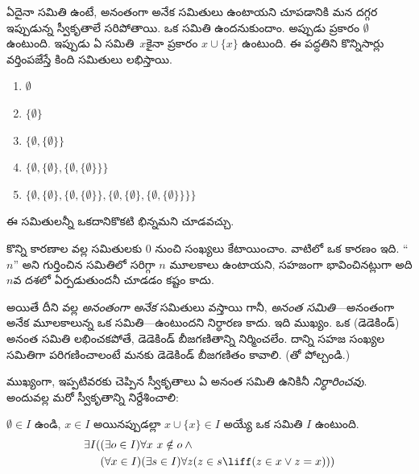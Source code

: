 \documentclass[../../../include/open-logic-section]{subfiles}
\begin{document}

ఏదైనా సమితి ఉంటే, అనంతంగా అనేక సమితులు ఉంటాయని చూపడానికి
మన దగ్గర ఇప్పుడున్న స్వీకృతాలే సరిపోతాయి.
ఒక సమితి
ఉందనుకుందాం. అప్పుడు
ప్రకారం $\emptyset$ ఉంటుంది.
ఇప్పుడు ఏ సమితి~$x$కైనా
ప్రకారం $x \cup \{x\}$ ఉంటుంది.
ఈ పద్ధతిని కొన్నిసార్లు వర్తింపజేస్తే కింది సమితులు లభిస్తాయి.
\begin{enumerate}
	\item[0.] $\emptyset$ %
	\item[1.] $ \{\emptyset\}$ %
	\item[2.] $\{\emptyset, \{\emptyset\}\}$ %
	\item[3.] $\{\emptyset, \{\emptyset\}, \{\emptyset, \{\emptyset\}\}\}$ %
	\item[4.] $\{\emptyset, \{\emptyset\}, \{\emptyset, \{\emptyset\}\}, \{\emptyset, \{\emptyset\}, \{\emptyset, \{\emptyset\}\}\}\}$%
\end{enumerate}
ఈ సమితులన్నీ ఒకదానికొకటి
భిన్నమని చూడవచ్చు.

కొన్ని కారణాల వల్ల సమితులకు $0$ నుంచి
సంఖ్యలు కేటాయించాం. వాటిలో ఒక కారణం ఇది.
``$n$'' అని గుర్తించిన
సమితిలో సరిగ్గా $n$
మూలకాలు ఉంటాయని,
సహజంగా భావించినట్లుగా అది
$n$వ దశలో ఏర్పడుతుందనీ
చూడడం కష్టం కాదు.

అయితే దీని వల్ల
\emph{అనంతంగా అనేక} సమితులు
వస్తాయి గానీ, \emph{అనంత
సమితి}---అనంతంగా అనేక
మూలకాలున్న ఒక సమితి---ఉంటుందని
నిర్ధారణ కాదు. ఇది
ముఖ్యం. ఒక
(డెడెకిండ్) అనంత సమితి
లభించకపోతే, డెడెకిండ్
బీజగణితాన్ని నిర్మించలేం.
దాన్ని సహజ సంఖ్యల
సమితిగా పరిగణించాలంటే
మనకు డెడెకిండ్ బీజగణితం
కావాలి. (తో
పోల్చండి.)

ముఖ్యంగా, ఇప్పటివరకు
చెప్పిన స్వీకృతాలు ఏ
అనంత సమితి ఉనికినీ
\emph{నిర్ధారించవు}.
అందువల్ల మరో స్వీకృతాన్ని
నిర్దేశించాలి:

\begin{axiom}[అనంతత్వం]
$\emptyset \in I$ ఉండి,
$x \in I$ అయినప్పుడల్లా
$x \cup \{x\} \in I$
అయ్యే ఒక సమితి $I$
ఉంటుంది.
\begin{align*}
	\exists I( & (\exists o \in I)\forall x\ x \notin o \land {}\\
	& (\forall x \in I)(\exists s \in I)\forall z(z \in s \liff (z \in x \lor z = x)))
\end{align*}
\end{axiom}
\end{document}
